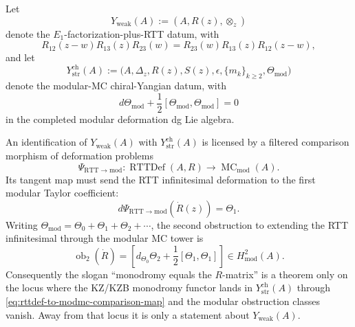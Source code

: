 \begin{theorem}
\label{thm:strong-weak-chiral-yangian-comparison-obstruction}
Let
\[
Y_{\mathrm{weak}}(A)
:=
(A,R(z),\otimes_z)
\]
denote the \(E_1\)-factorization-plus-RTT datum, with
\[
R_{12}(z-w)R_{13}(z)R_{23}(w)
=
R_{23}(w)R_{13}(z)R_{12}(z-w),
\]
and let
\[
Y_{\mathrm{str}}^{\mathrm{ch}}(A)
:=
\bigl(A,\Delta_z,R(z),S(z),\epsilon,\{m_k\}_{k\ge2},
\Theta_{\mathrm{mod}}\bigr)
\]
denote the modular-MC chiral-Yangian datum, with
\begin{equation}
\label{eq:strong-chiral-yangian-modular-mc}
d\Theta_{\mathrm{mod}}
+\frac12[\Theta_{\mathrm{mod}},\Theta_{\mathrm{mod}}]=0
\end{equation}
in the completed modular deformation dg Lie algebra.

An identification of \(Y_{\mathrm{weak}}(A)\) with
\(Y_{\mathrm{str}}^{\mathrm{ch}}(A)\) is licensed by a filtered
comparison morphism of deformation problems
\begin{equation}
\label{eq:rttdef-to-modmc-comparison-map}
\Psi_{\mathrm{RTT}\to\mathrm{mod}}\colon
\operatorname{RTTDef}(A,R)
\longrightarrow
\operatorname{MC}_{\mathrm{mod}}(A).
\end{equation}
Its tangent map must send the RTT infinitesimal deformation to the first
modular Taylor coefficient:
\begin{equation}
\label{eq:rttdef-tangent-to-theta-one}
d\Psi_{\mathrm{RTT}\to\mathrm{mod}}(\dot R(z))=\Theta_1.
\end{equation}
Writing
\(\Theta_{\mathrm{mod}}=\Theta_0+\Theta_1+\Theta_2+\cdots\), the
second obstruction to extending the RTT infinitesimal through the modular
MC tower is
\begin{equation}
\label{eq:strong-weak-chiral-yangian-ob2}
\operatorname{ob}_2(\dot R)
=
\left[
d_{\Theta_0}\Theta_2+\frac12[\Theta_1,\Theta_1]
\right]
\in H^2_{\mathrm{mod}}(A).
\end{equation}
Consequently the slogan ``monodromy equals the \(R\)-matrix'' is a
theorem only on the locus where the KZ/KZB monodromy functor lands in
\(Y_{\mathrm{str}}^{\mathrm{ch}}(A)\) through
\eqref{eq:rttdef-to-modmc-comparison-map} and the modular obstruction
classes vanish. Away from that locus it is only a statement about
\(Y_{\mathrm{weak}}(A)\).
\end{theorem}

